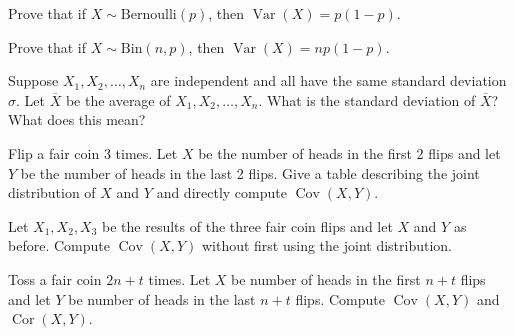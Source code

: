 \documentclass[10pt, a5paper]{scrartcl}
\DeclareMathOperator{\var}{Var}
\DeclareMathOperator{\cov}{Cov}
\DeclareMathOperator{\cor}{Cor}
\begin{document}
\boardquestions

\begin{exercise}[Variances]
  
  \begin{subex}
    Prove that if $X \sim \text{Bernoulli}(p)$, then $\var(X)= p(1-p)$.
  \end{subex}
  
  \begin{subex}
    Prove that if $X \sim \text{Bin}(n, p)$, then $\var(X)= np(1-p)$.
  \end{subex}
  
  \begin{subex}
    Suppose $X_1, X_2, \ldots, X_n$ are independent and all have the same standard
    deviation $\sigma$. Let $\overline{X}$ be the average of 
    $X_1, X_2, \ldots, X_n$. What is the standard deviation of $\overline{X}$? What
    does this mean?
  \end{subex}
\end{exercise}


\begin{exercise}[Covariance]
  \begin{subex}
    Flip a fair coin 3 times. Let $X$ be the number of heads in the first 2 flips
    and let $Y$ be the number of heads in the last 2 flips. Give a table describing
    the joint distribution of $X$ and $Y$ and directly compute $\cov(X,Y)$.
  \end{subex}
  
  \begin{subex}
    Let $X_1, X_2, X_3$ be the results of the three fair coin flips and let $X$ and $Y$
    as before. Compute $\cov(X,Y)$ without first using the joint distribution.
  \end{subex}

\end{exercise}


\begin{exercise}
  Toss a fair coin $2n+t$ times. Let $X$ be number of heads in the first $n+t$
  flips and let $Y$ be number of heads in the last $n+t$ flips. Compute
  $\cov(X,Y)$ and $\cor(X,Y)$.
\end{exercise}

\vfill\creditsboardquestions
\end{document}
